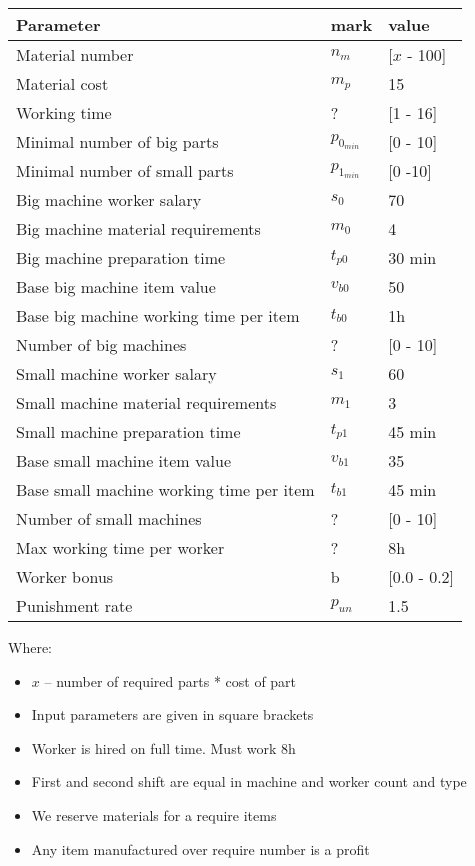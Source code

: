 \documentclass[a4paper]{article}
\begin{document}
\begin{longtable}[c]{lll}
Parameter & mark & value\\ \hline
Material number & $n_m$ & [$x$ - 100]\\
Material cost & $m_p$ & 15\\
Working time & ? & {[}1 - 16{]}\\
Minimal number of big parts & $p_{0_{min}}$ & [0 - 10]\\
Minimal number of small parts & $p_{1_{min}}$ & [0 -10]\\
Big machine worker salary & $s_0$ & 70\\
Big machine material requirements & $m_0$ & 4\\
Big machine preparation time & $t_{p0}$ & 30 min\\
Base big machine item value & $v_{b0}$ & 50\\
Base big machine working time per item & $t_{b0}$ & 1h\\
Number of big machines & ? & [0 - 10]\\
Small machine worker salary & $s_1$ & 60\\
Small machine material requirements & $m_1$ & 3\\
Small machine preparation time & $t_{p1}$ & 45 min\\
Base small machine item value & $v_{b1}$ & 35\\
Base small machine working time per item & $t_{b1}$ & 45 min\\
Number of small machines & ? & [0 - 10]\\
Max working time per worker & ? & 8h\\
Worker bonus & b & [0.0 - 0.2]\\
Punishment rate & $p_{un}$ & 1.5
\end{longtable}

Where:
\begin{itemize}
    \item $x$ -- number of required parts * cost of part
    \item Input parameters are given in square brackets
    \item Worker is hired on full time. Must work 8h
    \item First and second shift are equal in machine and worker count and type
    \item We reserve materials for a require items
    \item Any item manufactured over require number is a profit 
\end{itemize}
\end{document}
